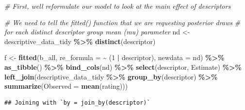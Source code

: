 \documentclass[
]{book}
\newenvironment{Shaded}{\begin{snugshade}}{\end{snugshade}}
\newcommand{\AttributeTok}[1]{\textcolor[rgb]{0.13,0.29,0.53}{#1}}
\newcommand{\CommentTok}[1]{\textcolor[rgb]{0.56,0.35,0.01}{\textit{#1}}}
\newcommand{\DecValTok}[1]{\textcolor[rgb]{0.00,0.00,0.81}{#1}}
\newcommand{\FunctionTok}[1]{\textcolor[rgb]{0.13,0.29,0.53}{\textbf{#1}}}
\newcommand{\NormalTok}[1]{#1}
\newcommand{\OtherTok}[1]{\textcolor[rgb]{0.56,0.35,0.01}{#1}}
\newcommand{\SpecialCharTok}[1]{\textcolor[rgb]{0.81,0.36,0.00}{\textbf{#1}}}
\begin{document}
\begin{Shaded}
\begin{Highlighting}[]
\CommentTok{\# First, we\textquotesingle{}ll reformulate our model to look at the main effect of descriptors}

\CommentTok{\# We need to tell the \textasciigrave{}fitted()\textasciigrave{} function that we are requesting posterior draws}
\CommentTok{\# for each distinct descriptor group mean (mu) parameter}
\NormalTok{nd }\OtherTok{\textless{}{-}}\NormalTok{ descriptive\_data\_tidy }\SpecialCharTok{\%\textgreater{}\%} \FunctionTok{distinct}\NormalTok{(descriptor)}

\NormalTok{f }\OtherTok{\textless{}{-}} 
  \FunctionTok{fitted}\NormalTok{(b\_all,}
         \AttributeTok{re\_formula =} \SpecialCharTok{\textasciitilde{}}\NormalTok{ (}\DecValTok{1} \SpecialCharTok{|}\NormalTok{ descriptor),}
         \AttributeTok{newdata =}\NormalTok{ nd) }\SpecialCharTok{\%\textgreater{}\%}
  \FunctionTok{as\_tibble}\NormalTok{() }\SpecialCharTok{\%\textgreater{}\%}
  \FunctionTok{bind\_cols}\NormalTok{(nd) }\SpecialCharTok{\%\textgreater{}\%}
  \FunctionTok{select}\NormalTok{(descriptor, Estimate) }\SpecialCharTok{\%\textgreater{}\%}
  \FunctionTok{left\_join}\NormalTok{(descriptive\_data\_tidy }\SpecialCharTok{\%\textgreater{}\%}
              \FunctionTok{group\_by}\NormalTok{(descriptor) }\SpecialCharTok{\%\textgreater{}\%}
              \FunctionTok{summarize}\NormalTok{(}\AttributeTok{Observed =} \FunctionTok{mean}\NormalTok{(rating)))}
\end{Highlighting}
\end{Shaded}

\begin{verbatim}
## Joining with `by = join_by(descriptor)`
\end{verbatim}
\end{document}

